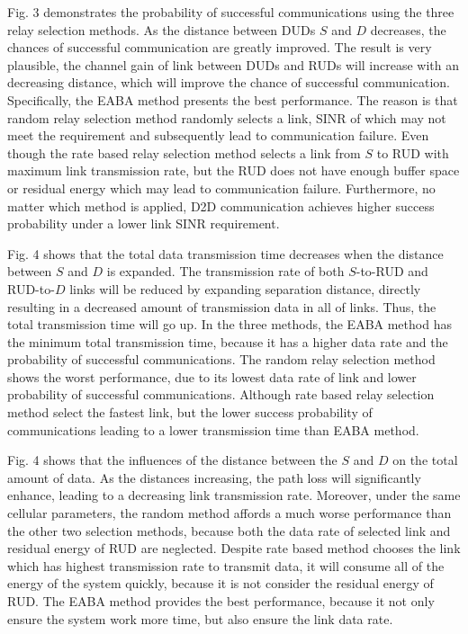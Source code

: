 \documentclass[conference]{IEEEtran}
\begin{document}
Fig. 3 demonstrates the probability of successful communications using the three relay selection methods. As the distance between DUDs $S$ and $D$ decreases, the chances of successful communication are greatly improved. The result is very plausible, the channel gain of link between DUDs and RUDs will increase with an decreasing distance, which will improve the chance of successful communication. Specifically, the EABA method presents the best performance. The reason is that random relay selection method randomly selects a link, SINR of which may not meet the requirement and subsequently lead to communication failure. Even though the rate based relay selection method selects a link from $S$ to RUD with maximum link transmission rate, but the RUD does not have enough buffer space or residual energy which may lead to communication failure. Furthermore, no matter which method is applied, D2D communication achieves higher success probability under a lower link SINR requirement.

Fig. 4 shows that the total data transmission time decreases when the distance between $S$ and $D$ is expanded. The transmission rate of both $S$-to-RUD and RUD-to-$D$ links will be reduced by expanding separation distance, directly resulting in a decreased amount of transmission data in all of links. Thus, the total transmission time will go up. In the three methods, the EABA method has the minimum total transmission time, because it has a higher data rate and the probability of successful communications. The random relay selection method shows the worst performance, due to its lowest data rate of link and lower probability of successful communications. Although rate based relay selection method select the fastest link, but the lower success probability of communications leading to a lower transmission time than EABA method.

Fig. 4 shows that the influences of the distance between the $S$ and $D$ on the total amount of data. As the distances increasing, the path loss will significantly enhance, leading to a decreasing link transmission rate. Moreover, under the same cellular parameters, the random method affords a much worse performance than the other two selection methods, because both the data rate of selected link and residual energy of RUD are neglected. Despite rate based method chooses the link which has highest transmission rate to transmit data, it will consume all of the energy of the system quickly, because it is not consider the residual energy of RUD. The EABA method provides the best performance, because it not only ensure the system work more time, but also ensure the link data rate.
\end{document}
